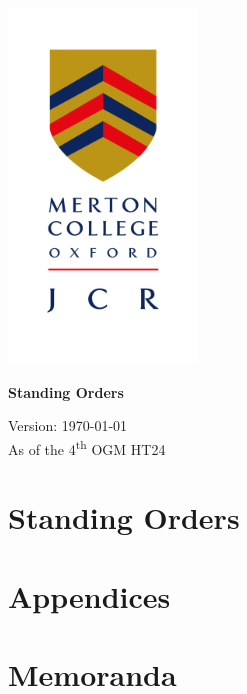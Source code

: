 \documentclass{standingorders}
\begin{document}
	\thispagestyle{empty}
	\begin{center}
		\includegraphics[width=5cm]{mertoncollegejcr}
		\begin{vplace}[0.1] \Huge  
			\textbf{Standing Orders}
		\end{vplace}
		{ {\Large
			Version: \today}\\
			\small As of the 4\textsuperscript{th} OGM HT24
			
		}
		\vfill
	\end{center}
	\cleardoublepage
	\frontmatter
	\tableofcontents
	
	
	\mainmatter
	\part{Standing Orders}
	
	
	
	
	
	
	
	
	
	
	
	\part{Appendices}
	\begin{appendices}
		
        
		
		
		
		
		
	\end{appendices}
	\part{Memoranda}
	\begin{appendices}
		\setcounter{chapter}{12}
		
	\end{appendices}
\end{document}
